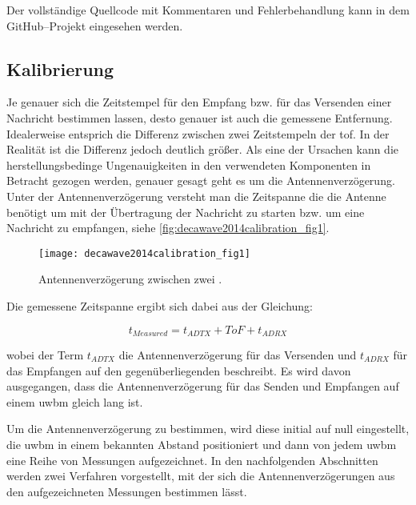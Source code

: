 Der vollständige Quellcode mit Kommentaren und Fehlerbehandlung kann in dem GitHub--Projekt \cite{kasdorf2017roslamwithuwb} eingesehen werden.


\begin{comment}
--------------------------------------------------------------------------------
\end{comment}
\subsection{Kalibrierung}

Je genauer sich die Zeitstempel für den Empfang bzw. für das Versenden einer Nachricht bestimmen lassen, desto genauer ist auch die gemessene Entfernung. Idealerweise entsprich die Differenz zwischen zwei Zeitstempeln der \Gls{tof}. In der Realität ist die Differenz jedoch deutlich größer. Als eine der Ursachen kann die herstellungsbedinge Ungenauigkeiten in den verwendeten Komponenten in Betracht gezogen werden, genauer gesagt geht es um die Antennenverzögerung. Unter der Antennenverzögerung versteht man die Zeitspanne die die Antenne benötigt um mit der Übertragung der Nachricht zu starten bzw. um eine Nachricht zu empfangen, siehe  \autoref{fig:decawave2014calibration_fig1}.

\begin{figure}[h]
	\centering
	\texttt{[image: decawave2014calibration\_fig1]}
	\caption{Antennenverzögerung zwischen zwei .}
	\label{fig:decawave2014calibration_fig1}
\end{figure}

Die gemessene Zeitspanne ergibt sich dabei aus der Gleichung: 

\begin{equation}
t_{Measured}=t_{ADTX}+ToF+t_{ADRX}\label{eq:antenna_delay_1}
\end{equation}

wobei der Term $t_{ADTX}$ die Antennenverzögerung für das Versenden und $t_{ADRX}$ für das Empfangen auf den gegenüberliegenden  beschreibt. Es wird davon ausgegangen, dass die Antennenverzögerung für das Senden und Empfangen auf einem \Gls{uwbm} gleich lang ist. \cite{decawave2016dw1kusermanual}

Um die Antennenverzögerung zu bestimmen, wird diese initial auf null eingestellt, die \Gls{uwbm} in einem bekannten Abstand positioniert und dann von jedem \Gls{uwbm} eine Reihe von Messungen aufgezeichnet. In den nachfolgenden Abschnitten werden zwei Verfahren vorgestellt, mit der sich die Antennenverzögerungen aus den aufgezeichneten Messungen bestimmen lässt.


